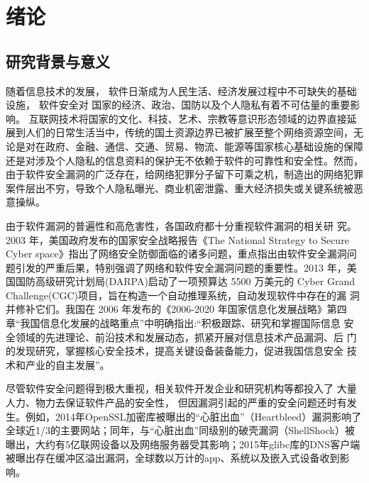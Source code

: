 \chapter{绪论}
\section{研究背景与意义}
随着信息技术的发展， %
软件日渐成为人民生活、经济发展过程中不可缺失的基础设施， %
软件安全对
国家的经济、政治、国防以及个人隐私有着不可估量的重要影响。
互联网技术将国家的文化、科技、艺术、宗教等意识形态领域的边界直接延展到人们的日常生活当中，传统的国土资源边界已被扩展至整个网络资源空间，无论是对在政府、金融、通信、交通、贸易、物流、能源等国家核心基础设施的保障还是对涉及个人隐私的信息资料的保护无不依赖于软件的可靠性和安全性。然而，由于软件安全漏洞的广泛存在，给网络犯罪分子留下可乘之机，制造出的网络犯罪案件层出不穷，导致个人隐私曝光、商业机密泄露、重大经济损失或关键系统被恶意操纵。

由于软件漏洞的普遍性和高危害性，各国政府都十分重视软件漏洞的相关研
究。2003 年，美国政府发布的国家安全战略报告《The National Strategy to Secure
Cyber space》指出了网络安全防御面临的诸多问题，重点指出由软件安全漏洞问
题引发的严重后果，特别强调了网络和软件安全漏洞问题的重要性。2013 年，美
国国防高级研究计划局(DARPA)启动了一项预算达 5500 万美元的 Cyber Grand
Challenge(CGC)项目，旨在构造一个自动推理系统，自动发现软件中存在的漏
洞并修补它们。我国在 2006 年发布的《2006-2020 年国家信息化发展战略》第四
章“我国信息化发展的战略重点”中明确指出:“积极跟踪、研究和掌握国际信息
安全领域的先进理论、前沿技术和发展动态，抓紧开展对信息技术产品漏洞、后
门的发现研究，掌握核心安全技术，提高关键设备装备能力，促进我国信息安全
技术和产业的自主发展”。

尽管软件安全问题得到极大重视，相关软件开发企业和研究机构等都投入了
大量人力、物力去保证软件产品的安全性，
但因漏洞引起的严重的安全问题还时有发生。例如，2014年OpenSSL加密库被曝出的“心脏出血”（Heartbleed）漏洞影响了全球近1/3的主要网站；同年，与“心脏出血”同级别的破壳漏洞（ShellShock）被曝出，大约有5亿联网设备以及网络服务器受其影响；2015年glibc库的DNS客户端被曝出存在缓冲区溢出漏洞，全球数以万计的app、系统以及嵌入式设备收到影响。



